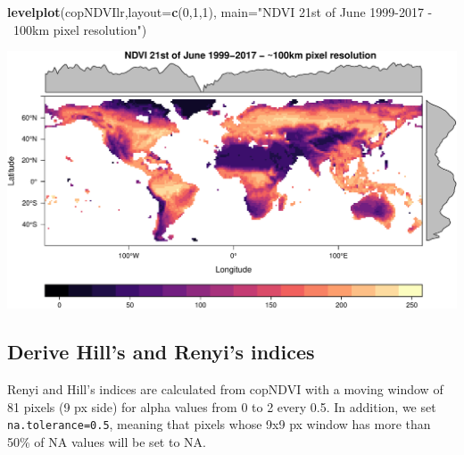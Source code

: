 \documentclass[
]{article}
\newenvironment{Shaded}{\begin{snugshade}}{\end{snugshade}}
\newcommand{\DataTypeTok}[1]{\textcolor[rgb]{0.13,0.29,0.53}{#1}}
\newcommand{\DecValTok}[1]{\textcolor[rgb]{0.00,0.00,0.81}{#1}}
\newcommand{\KeywordTok}[1]{\textcolor[rgb]{0.13,0.29,0.53}{\textbf{#1}}}
\newcommand{\NormalTok}[1]{#1}
\newcommand{\StringTok}[1]{\textcolor[rgb]{0.31,0.60,0.02}{#1}}
\begin{document}
\begin{Shaded}
\begin{Highlighting}[]
\KeywordTok{levelplot}\NormalTok{(copNDVIlr,}\DataTypeTok{layout=}\KeywordTok{c}\NormalTok{(}\DecValTok{0}\NormalTok{,}\DecValTok{1}\NormalTok{,}\DecValTok{1}\NormalTok{), }\DataTypeTok{main=}\StringTok{"NDVI 21st of June 1999-2017 - ~100km pixel resolution"}\NormalTok{)}
\end{Highlighting}
\end{Shaded}

\begin{center}\includegraphics[width=0.95\linewidth]{vignettes_rasterdiv_files/figure-latex/fig01-2} \end{center}

\hypertarget{derive-hills-and-renyis-indices}{%
\subsection{Derive Hill's and Renyi's
indices}\label{derive-hills-and-renyis-indices}}

Renyi and Hill's indices are calculated from copNDVI with a moving
window of 81 pixels (9 px side) for alpha values from 0 to 2 every 0.5.
In addition, we set \texttt{na.tolerance=0.5}, meaning that pixels whose
9x9 px window has more than 50\% of NA values will be set to NA.
\end{document}
